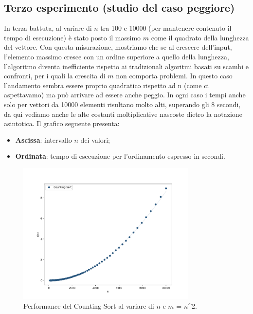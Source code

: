 \documentclass[a4paper, 12pt, oneside]{book}
\begin{document}
\subsection{Terzo esperimento (studio del caso peggiore)}
\noindent In terza battuta, al variare di \(n\) tra 100 e 10000 (per mantenere contenuto il tempo di esecuzione) è stato posto il massimo \(m\) come il quadrato della lunghezza del vettore. Con questa misurazione, mostriamo che se al crescere dell'input, l'elemento massimo cresce con un ordine superiore a quello della lunghezza, l'algoritmo diventa inefficiente rispetto ai tradizionali algoritmi basati su scambi e confronti, per i quali la crescita di \(m\) non comporta problemi. In questo caso l'andamento sembra essere proprio quadratico rispetto ad n (come ci aspettavamo) ma può arrivare ad essere anche peggio. In ogni caso i tempi anche solo per vettori da 10000 elementi risultano molto alti, superando gli 8 secondi, da qui vediamo anche le alte costanti moltiplicative nascoste dietro la notazione asintotica.
Il grafico seguente presenta:
\begin{itemize}
    \item \textbf{Ascissa}: intervallo \(n\) dei valori;
    \item \textbf{Ordinata}: tempo di esecuzione per l'ordinamento espresso in secondi.
\end{itemize}

\begin{figure}[H]
    \centering
    \includegraphics[width=0.8\textwidth]{images/countingSortQuadratico.png}
    \caption{Performance del Counting Sort al variare di \(n\) e \(m\) = \(n\)^2.}
    \label{fig:counting_sort_m}
\end{figure}
\end{document}

